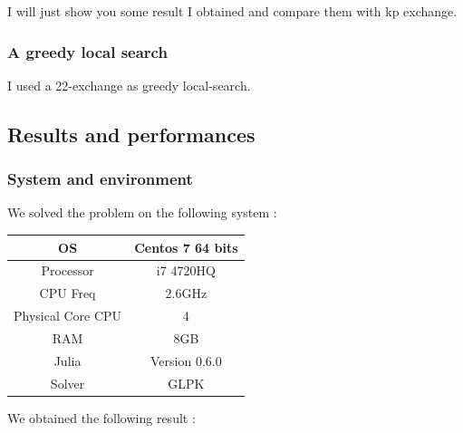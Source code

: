 \documentclass[12pt]{article}
\begin{document}
	I will just show you some result I obtained and compare them with kp exchange. 
	\subsubsection{A greedy local search}
	I used a 22-exchange as greedy local-search.
	\subsection{Results and performances}
	\subsubsection{System and environment}
	We solved the problem on the following system :
	\begin{center}
		\begin{tabular}{|c|c|}
			\hline
			OS & Centos 7 64 bits \\
			\hline
			Processor & i7 4720HQ \\
			\hline
			CPU Freq & 2.6GHz \\
			\hline
			Physical Core CPU & 4 \\
			\hline
			RAM & 8GB \\
			\hline
			Julia & Version 0.6.0 \\
			\hline
			Solver & GLPK\\
			\hline
		\end{tabular}
	\end{center}
	We obtained the following result :
\end{document}
